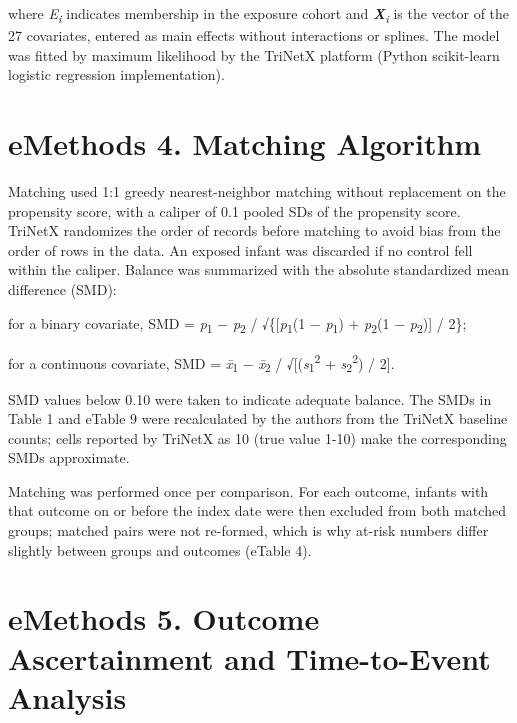 \documentclass[11pt]{article}
\begin{document}
where \emph{E\textsubscript{i}} indicates membership in the
exposure cohort and
\textbf{\emph{X}}\emph{\textsubscript{i}} is the vector of
the 27 covariates, entered as main effects without
interactions or splines. The model was fitted by maximum
likelihood by the TriNetX platform (Python scikit-learn
logistic regression implementation).

\hypertarget{emethods-4.-matching-algorithm}{%
\section*{eMethods 4. Matching
Algorithm}\label{emethods-4.-matching-algorithm}}

Matching used 1:1 greedy nearest-neighbor matching without
replacement on the propensity score, with a caliper of 0.1
pooled SDs of the propensity score. TriNetX randomizes the
order of records before matching to avoid bias from the
order of rows in the data. An exposed infant was discarded
if no control fell within the caliper. Balance was
summarized with the absolute standardized mean difference
(SMD):

for a binary covariate, SMD =
\textbar{}\emph{p}\textsubscript{1} −
\emph{p}\textsubscript{2}\textbar{} /
√\{{[}\emph{p}\textsubscript{1}(1 −
\emph{p}\textsubscript{1}) + \emph{p}\textsubscript{2}(1 −
\emph{p}\textsubscript{2}){]} / 2\};

for a continuous covariate, SMD =
\textbar{}\emph{x̄}\textsubscript{1} −
\emph{x̄}\textsubscript{2}\textbar{} /
√{[}(\emph{s}\textsubscript{1}\textsuperscript{2} +
\emph{s}\textsubscript{2}\textsuperscript{2}) / 2{]}.

SMD values below 0.10 were taken to indicate adequate
balance. The SMDs in Table 1 and eTable 9 were recalculated
by the authors from the TriNetX baseline counts; cells
reported by TriNetX as 10 (true value 1-10) make the
corresponding SMDs approximate.

Matching was performed once per comparison. For each
outcome, infants with that outcome on or before the index
date were then excluded from both matched groups; matched
pairs were not re-formed, which is why at-risk numbers
differ slightly between groups and outcomes (eTable 4).

\hypertarget{emethods-5.-outcome-ascertainment-and-time-to-event-analysis}{%
\section*{eMethods 5. Outcome Ascertainment and Time-to-Event
Analysis}\label{emethods-5.-outcome-ascertainment-and-time-to-event-analysis}}
\end{document}
